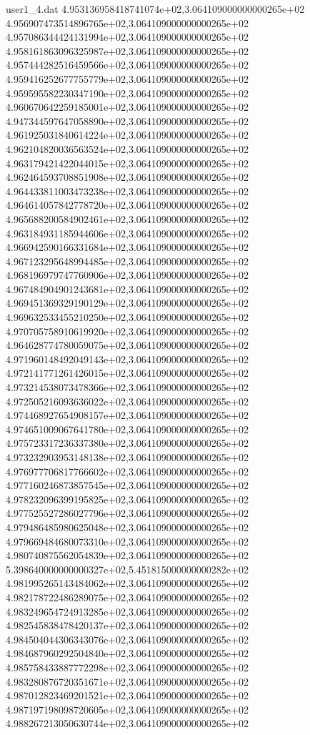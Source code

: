 \begin{filecontents}{user1_4.dat}
4.953136958418741074e+02,3.064109000000000265e+02
4.956907473514896765e+02,3.064109000000000265e+02
4.957086344424131994e+02,3.064109000000000265e+02
4.958161863096325987e+02,3.064109000000000265e+02
4.957444282516459566e+02,3.064109000000000265e+02
4.959416252677755779e+02,3.064109000000000265e+02
4.959595582230347190e+02,3.064109000000000265e+02
4.960670642259185001e+02,3.064109000000000265e+02
4.947344597647058890e+02,3.064109000000000265e+02
4.961925031840614224e+02,3.064109000000000265e+02
4.962104820036563524e+02,3.064109000000000265e+02
4.963179421422044015e+02,3.064109000000000265e+02
4.962464593708851908e+02,3.064109000000000265e+02
4.964433811003473238e+02,3.064109000000000265e+02
4.964614057842778720e+02,3.064109000000000265e+02
4.965688200584902461e+02,3.064109000000000265e+02
4.963184931185944606e+02,3.064109000000000265e+02
4.966942590166331684e+02,3.064109000000000265e+02
4.967123295648994485e+02,3.064109000000000265e+02
4.968196979747760906e+02,3.064109000000000265e+02
4.967484904901243681e+02,3.064109000000000265e+02
4.969451369329190129e+02,3.064109000000000265e+02
4.969632533455210250e+02,3.064109000000000265e+02
4.970705758910619920e+02,3.064109000000000265e+02
4.964628774780059075e+02,3.064109000000000265e+02
4.971960148492049143e+02,3.064109000000000265e+02
4.972141771261426015e+02,3.064109000000000265e+02
4.973214538073478366e+02,3.064109000000000265e+02
4.972505216093636022e+02,3.064109000000000265e+02
4.974468927654908157e+02,3.064109000000000265e+02
4.974651009067641780e+02,3.064109000000000265e+02
4.975723317236337380e+02,3.064109000000000265e+02
4.973232903953148138e+02,3.064109000000000265e+02
4.976977706817766602e+02,3.064109000000000265e+02
4.977160246873857545e+02,3.064109000000000265e+02
4.978232096399195825e+02,3.064109000000000265e+02
4.977525527286027796e+02,3.064109000000000265e+02
4.979486485980625048e+02,3.064109000000000265e+02
4.979669484680073310e+02,3.064109000000000265e+02
4.980740875562054839e+02,3.064109000000000265e+02
5.398640000000000327e+02,5.451815000000000282e+02
4.981995265143484062e+02,3.064109000000000265e+02
4.982178722486289075e+02,3.064109000000000265e+02
4.983249654724913285e+02,3.064109000000000265e+02
4.982545838478420137e+02,3.064109000000000265e+02
4.984504044306343076e+02,3.064109000000000265e+02
4.984687960292504840e+02,3.064109000000000265e+02
4.985758433887772298e+02,3.064109000000000265e+02
4.983280876720351671e+02,3.064109000000000265e+02
4.987012823469201521e+02,3.064109000000000265e+02
4.987197198098720605e+02,3.064109000000000265e+02
4.988267213050630744e+02,3.064109000000000265e+02

\end{filecontents}
